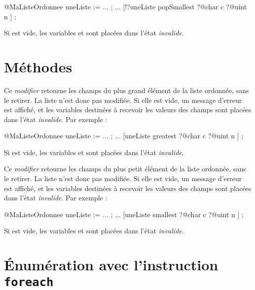 \begin{galgascode}
@MaListeOrdonnee uneListe := ... ;
...
[!?uneListe popSmallest
  ?@char c
  ?@uint n
] ;
\end{galgascode}

Si  est vide, les variables  et  sont placées dans l'état \emph{invalide}.










\section{Méthodes}


Ce \emph{modifier} retourne les champs du plus grand élément de la liste ordonnée, sans le retirer. La liste n'est donc pas modifiée. Si elle est vide, un message d'erreur est affiché, et les variables destinées à recevoir les valeurs des champs sont placées dans l'état \emph{invalide}. Par exemple :

\begin{galgascode}
@MaListeOrdonnee uneListe := ... ;
...
[uneListe greatest
  ?@char c
  ?@uint n
] ;
\end{galgascode}

Si  est vide, les variables  et  sont placées dans l'état \emph{invalide}.



Ce \emph{modifier} retourne les champs du plus petit élément de la liste ordonnée, sans le retirer. La liste n'est donc pas modifiée. Si elle est vide, un message d'erreur est affiché, et les variables destinées à recevoir les valeurs des champs sont placées dans l'état \emph{invalide}. Par exemple :

\begin{galgascode}
@MaListeOrdonnee uneListe := ... ;
...
[uneListe smallest
  ?@char c
  ?@uint n
] ;
\end{galgascode}

Si  est vide, les variables  et  sont placées dans l'état \emph{invalide}.




\section{Énumération avec l'instruction \texttt{foreach}}


